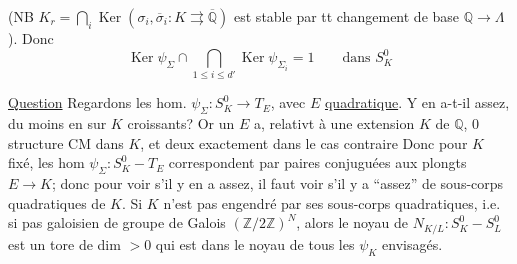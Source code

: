 (NB $K_r=\bigcap_i\operatorname{Ker}(\sigma_i,\overline\sigma_i:
K\rightrightarrows\overline{\mathbb Q})$ est stable par tt changement de base
$\mathbb Q\longrightarrow\Lambda$). Donc
\[
\operatorname{Ker}\psi_\Sigma\cap\bigcap_{1\leq i\leq d'}\operatorname{Ker}\psi_{\Sigma_i}
=1\qquad\text{dans }S_K^0
\]

\uline{Question} Regardons les hom. $\psi_\Sigma:S_K^0\longrightarrow T_E$, avec $E$
\uline{quadratique}. Y en a-t-il assez, du moins en  sur $K$ croissants?
Or un $E$ a, relativt à une  extension $K$ de $\mathbb Q$,
 $0$ structure CM  dans $K$, et deux exactement
dans le cas contraire 
\inserted{[L'hom $\psi_K$ correspondant est \deleted{\unsure{\operatorname{Tr}_{K/E}}} $N_{K/E}$.}
Donc pour $K$ fixé, les hom $\psi_\Sigma:S_K^0-T_E$ correspondent par paires conjuguées
aux plongts $E\longrightarrow K$; donc pour voir s'il y en a assez, il faut voir s'il y a
``assez'' de sous-corps quadratiques de $K$.
Si $K$  n'est pas 
engendré par ses sous-corps quadratiques, i.e. si  
pas galoisien de groupe de Galois $(\mathbb Z/2\mathbb Z)^N$, alors le noyau de
$N_{K/L}:S_K^0-S_L^0$ est un tore de dim $>0$ qui est dans le noyau de tous les
$\psi_K$ envisagés.
